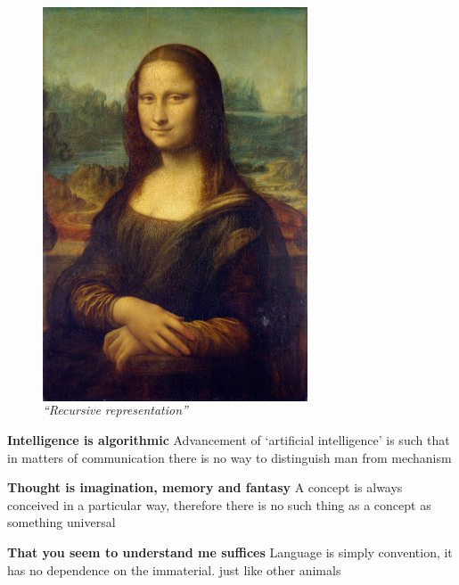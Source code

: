 \documentclass[xcolor=dvipsnames]{beamer}
\begin{document}
\begin{frame}[plain]
\begin{figure}
  \centering
  \begin{columns}
    \centering
    \includegraphics[width=0.7\textwidth,trim=0 150mm 0 0, clip]{mona-lisa}
    \caption {\emph{``Recursive representation''}}
  \end{columns}
\end{figure}
\end{frame}


\begin{frame}[plain]
\textbf{Intelligence is algorithmic}\newline
Advancement of `artificial intelligence' is such that in matters of communication there is no way to distinguish man from mechanism \vspace{10mm}

\textbf{Thought is imagination, memory and fantasy}\newline
A concept is always conceived in a particular way, therefore there is no such thing as a concept as something universal \vspace{10mm}

\textbf{That you seem to understand me suffices}\newline
Language is simply convention, it has no dependence on the immaterial. just like other animals \vspace{10mm}
\end{frame}
\end{document}
